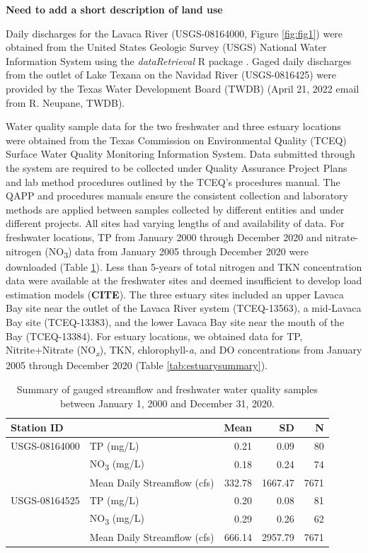 \documentclass[water,article,submit,oneauthor]{Definitions/mdpi}
\begin{document}
\textbf{Need to add a short description of land use}

Daily discharges for the Lavaca River (USGS-08164000, Figure
\ref{fig:fig1}) were obtained from the United States Geologic Survey
(USGS) National Water Information System using the \emph{dataRetrieval}
R package \citep{deciccoDataRetrievalPackagesDiscovering2022}. Gaged
daily discharges from the outlet of Lake Texana on the Navidad River
(USGS-0816425) were provided by the Texas Water Development Board (TWDB)
(April 21, 2022 email from R. Neupane, TWDB).

Water quality sample data for the two freshwater and three estuary
locations were obtained from the Texas Commission on Environmental
Quality (TCEQ) Surface Water Quality Monitoring Information System. Data
submitted through the system are required to be collected under Quality
Assurance Project Plans and lab method procedures outlined by the TCEQ's
procedures manual. The QAPP and procedures manuals ensure the consistent
collection and laboratory methods are applied between samples collected
by different entities and under different projects. All sites had
varying lengths of and availability of data. For freshwater locations,
TP from January 2000 through December 2020 and nitrate-nitrogen
(NO\textsubscript{3}) data from January 2005 through December 2020 were
downloaded (Table \ref{tab:fwsummary}). Less than 5-years of total
nitrogen and TKN concentration data were available at the freshwater
sites and deemed insufficient to develop load estimation models
(\textbf{CITE}). The three estuary sites included an upper Lavaca Bay
site near the outlet of the Lavaca River system (TCEQ-13563), a
mid-Lavaca Bay site (TCEQ-13383), and the lower Lavaca Bay site near the
mouth of the Bay (TCEQ-13384). For estuary locations, we obtained data
for TP, Nitrite+Nitrate (NO\emph{\textsubscript{x}}), TKN,
chlorophyll-\emph{a}, and DO concentrations from January 2005 through
December 2020 (Table \ref{tab:estuarysummary}).

\begin{table}[H]

\caption{\label{tab:fwsummary}Summary of gauged streamflow and freshwater water quality samples between January 1, 2000 and December 31, 2020.}
\centering
\begin{tabular}[t]{llrrr}
\toprule
Station ID &   & Mean & SD & N\\
\midrule
USGS-08164000 & TP (mg/L) & \num{0.21} & \num{0.09} & 80\\
 & NO\textsubscript{3} (mg/L) & \num{0.18} & \num{0.24} & 74\\
 & Mean Daily Streamflow (cfs) & \num{332.78} & \num{1667.47} & 7671\\
USGS-08164525 & TP (mg/L) & \num{0.20} & \num{0.08} & 81\\
 & NO\textsubscript{3} (mg/L) & \num{0.29} & \num{0.26} & 62\\
 & Mean Daily Streamflow (cfs) & \num{666.14} & \num{2957.79} & 7671\\
\bottomrule
\end{tabular}
\end{table}
\end{document}
